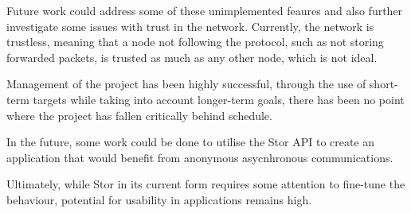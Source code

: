 		Future work could address some of these unimplemented feaures and also further investigate some issues with trust in the network. Currently, the network is trustless, meaning that a node not following the protocol, such as not storing forwarded packets, is trusted as much as any other node, which is not ideal.
		
		Management of the project has been highly successful, through the use of short-term targets while taking into account longer-term goals, there has been no point where the project has fallen critically behind schedule.

		In the future, some work could be done to utilise the Stor API to create an application that would benefit from anonymous asycnhronous communications.
		
		Ultimately, while Stor in its current form requires some attention to fine-tune the behaviour, potential for usability in applications remains high.